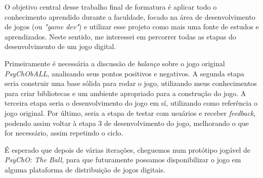   O objetivo central desse trabalho final de formatura é aplicar todo o conhecimento aprendido durante a faculdade, focado na área de desenvolvimento de jogos (ou \textit{"game dev"}) e utilizar esse projeto como mais uma fonte de estudos e aprendizados. Neste sentido, me interessei em percorrer todas as etapas do desenvolvimento de um jogo digital.

  Primeiramente é necessária a discussão de \textit{balanço} sobre o jogo original \textit{PsyChObALL}, analisando seus pontos positivos e negativos. A segunda etapa seria construir uma base sólida para rodar o jogo, utilizando meus conhecimentos para criar bibliotecas e um ambiente apropriado para a construção do jogo. A terceira etapa seria o desenvolvimento do jogo em sí, utilizando como referência o jogo original. Por último, seria a etapa de testar com usuários e receber \textit{feedback}, podendo assim voltar à etapa 3 de desenvolvimento do jogo, melhorando o que for necessário, assim repetindo o ciclo.

  É esperado que depois de várias iterações, cheguemos num protótipo jogável de \textit{PsyChO: The Ball}, para que futuramente possamos disponibilizar o jogo em alguma plataforma de distribuição de jogos digitais.
